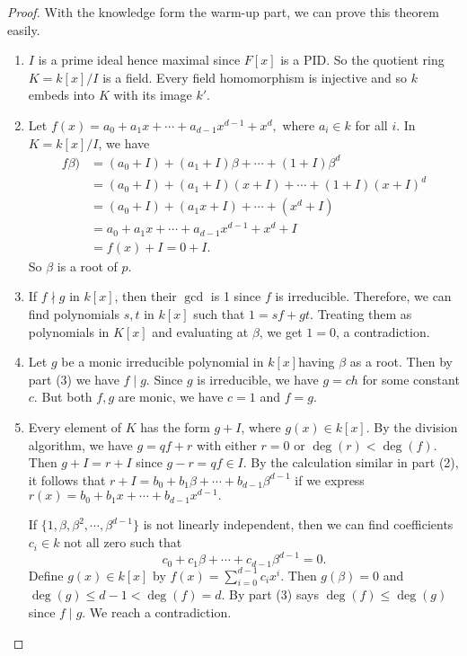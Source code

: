 \documentclass[12pt]{report}
\theoremstyle{definition}
\def\bb{\beta}
\begin{document}
\begin{proof}
    With the knowledge form the warm-up part, we can prove this theorem easily.
    \begin{enumerate}
        \item  $I$ is a prime ideal hence maximal since $F[x]$ is a PID. So the quotient ring $K=k[x]/I$ is a field. Every field homomorphism is injective and so $k$ embeds into $K$ with its image $k'$.
        \item Let $f(x)= a_0+a_1x+\cdots+a_{d-1}x^{d-1}+x^d,$ where $a_i\in k$ for all $i$. In $K=k[x]/I$, we have \begin{align*}
            f\bb) &= (a_0+I)+(a_1+I)\bb+\cdots+(1+I)\bb^d \\
            &= (a_0+I)+(a_1+I)(x+I)+\cdots+(1+I)(x+I)^d \\
            &= (a_0+I)+(a_1x+I)+\cdots+(x^d +I)\\
            &= a_0+a_1x+\cdots+a_{d-1}x^{d-1}+x^d +I \\
            &= f(x)+I = 0+I.
        \end{align*} So $\beta$ is a root of $p$.
        \item If $f\nmid g$ in $k[x]$, then their $\gcd$ is 1 since $f$ is irreducible. Therefore, we can find polynomials $s,t$ in $k[x]$ such that $1=sf+gt$. Treating them as polynomials in $K[x]$ and evaluating at $\beta$, we get $1=0$, a contradiction.
        \item Let $g$ be a monic irreducible polynomial in $k[x]$having $\bb$ as a root. Then by part (3) we have $f\mid g$. Since $g$ is irreducible, we have $g=ch$ for some constant $c$. But both $f,g$ are monic, we have $c=1$ and $f=g$.
        \item Every element of $K$ has the form $g+I$, where $g(x)\in k[x]$. By the division algorithm, we have $g=qf+r$ with either $r=0$ or $\deg(r)<\deg(f)$. Then $g+I=r+I$ since $g-r=qf\in I$. By the calculation similar in part (2), it follows that $r+I = b_0+b_1\bb+\cdots+ b_{d-1} \bb^{d-1}$ if we express $r(x)= b_0+b_1 x+\cdots+b_{d-1}x^{d-1}.$   
        
        If $\{1,\beta,\beta^2,\cdots,\beta^{d-1}\}$ is not linearly independent, then we can find coefficients $c_i\in k$ not all zero such that $$c_0+c_1\bb+\cdots+c_{d-1}\bb^{d-1}=0.$$ Define $g(x)\in k[x]$ by $f(x)=\sum_{i=0}^{d-1}c_ix^i$. Then $g(\bb)=0$ and $\deg(g)\leq d-1 <\deg(f)=d$. By part (3) says $\deg(f)\leq \deg(g)$ since $f\mid g$. We reach a contradiction.
    \end{enumerate}
\end{proof}
\end{document}

